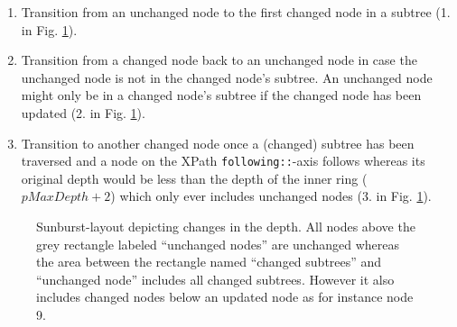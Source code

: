 \begin{enumerate}
\item Transition from an unchanged node to the first changed node in a subtree (1. in Fig. \ref{fig:sunburst-layout}). 
\item Transition from a changed node back to an unchanged node in case the unchanged node is not in the changed node's subtree. An unchanged node might only be in a changed node's subtree if the changed node has been updated (2. in Fig. \ref{fig:sunburst-layout}).
\item Transition to another changed node once a (changed) subtree has been traversed and a node on the XPath \texttt{following::}-axis follows whereas its original depth would be less than the depth of the inner ring ($pMaxDepth + 2$) which only ever includes unchanged nodes (3. in Fig. \ref{fig:sunburst-layout}).
\end{enumerate}

\begin{figure}[tb]
\caption{\label{fig:sunburst-layout} Sunburst-layout depicting changes in the depth. All nodes above the grey rectangle labeled ``unchanged nodes'' are unchanged whereas the area between the rectangle named ``changed subtrees'' and ``unchanged node'' includes all changed subtrees. However it also includes changed nodes below an updated node as for instance node 9.}
\end{figure}

